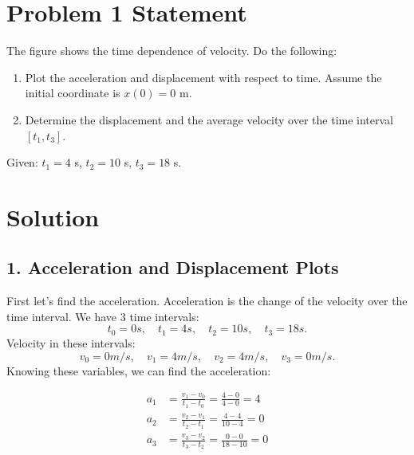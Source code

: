 \documentclass{article}
\begin{document}


\section*{Problem 1 Statement}
The figure shows the time dependence of velocity. Do the following:

\begin{enumerate}
    \item Plot the acceleration and displacement with respect to time. Assume the initial coordinate is $x(0) = 0$ m.
    \item Determine the displacement and the average velocity over the time interval $[t_1, t_3]$.
\end{enumerate}

Given: $t_1 = 4$ s, $t_2 = 10$ s, $t_3 = 18$ s.

\section*{Solution}

\subsection*{1. Acceleration and Displacement Plots}
First let's find the acceleration. Acceleration is the change of the velocity over the time interval.
We have 3 time intervals: 
\[
t_0 = 0s, \quad t_1 = 4s, \quad t_2 = 10s, \quad t_3 = 18s.
\]
Velocity in these intervals:
\[
v_0 = 0 m/s, \quad v_1 = 4m/s, \quad v_2 = 4m/s, \quad v_3 = 0m/s.
\]
Knowing these variables, we can find the acceleration:

\begin{align*}
a_1 &= \frac{v_1 - v_0}{t_1 - t_0} = \frac{4 - 0}{4 - 0} = 4 \\
a_2 &= \frac{v_2 - v_1}{t_2 - t_1} = \frac{4 - 4}{10 - 4} = 0 \\
a_3 &= \frac{v_3 - v_2}{t_3 - t_2} = \frac{0 - 0}{18 - 10} = 0
\end{align*}
\end{document}
